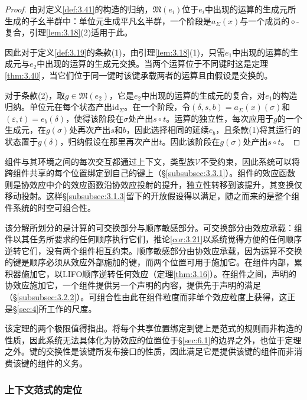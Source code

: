 \begin{proof}
由对定义\ref{def:3.41}的构造的归纳，$\mathfrak{M}(e_i)$位于$e_i$中出现的运算的生成元所生成的子幺半群中：单位元生成平凡幺半群，一个阶段是$a_\Sigma(x)$与一个成员的$\diamond$-复合，引理\ref{lem:3.18}(2)适用于此。

因此对于定义\ref{def:3.19}的条款(1)，由引理\ref{lem:3.18}(1)，只需$e_1$中出现的运算的生成元与$e_2$中出现的运算的生成元交换。当两个运算位于不同键时这是定理\ref{thm:3.40}，当它们位于同一键时该键承载两者的运算且由假设是交换的。

对于条款(2)，取$g \in \mathfrak{M}(e_2)$，它是$e_2$中出现的运算的生成元的复合，对$e_1$的构造归纳。单位元在每个状态产出$\mathrm{id}_\Sigma$。在一个阶段，令$(\delta, s, b) = a_\Sigma(x)(\sigma)$和$(\varepsilon, t) = e_b(\delta)$，使得该阶段在$\sigma$处产出$s \circ t$。运算的独立性，每次应用于$g$的一个生成元，在$g(\sigma)$处再次产出$s$和$b$，因此选择相同的延续$e_b$，且条款(1)将其运行的状态置于$g(\delta)$，归纳假设在那里再次产出$t$。因此该阶段在$g(\sigma)$处产出$s \circ t$。
\end{proof}

组件与其环境之间的每次交互都通过上下文，类型族$\mathcal{V}$不受约束，因此系统可以将跨组件共享的每个位置绑定到自己的键上（\S\ref{subsubsec:3.3.1}）。组件的效应函数则是协效应中介的效应函数沿协效应投射的提升，独立性转移到该提升，其变换仅移动投射。这样\S\ref{subsubsec:3.1.3}留下的开放假设得以满足，随之而来的是整个组件系统的时空可组合性。

该分解所划分的是计算的可交换部分与顺序敏感部分。可交换部分由效应承载：组件以其任务所要求的任何顺序执行它们，推论\ref{cor:3.21}以系统觉得方便的任何顺序逆转它们，没有两个组件相互约束。顺序敏感部分由协效应承载，因为运算不交换的键是顺序必须从效应外部施加的键，而两个位置可用于施加它。在组件内部，累积器施加它，以LIFO顺序逆转任何效应（定理\ref{thm:3.16}）。在组件之间，声明的协效应施加它，一个组件提供另一个声明的内容，提供先于声明的满足（\S\ref{subsubsec:3.2.2}）。可组合性由此在组件粒度而非单个效应粒度上获得，这正是\S\ref{sec:4}所工作的尺度。

该定理的两个极限值得指出。将每个共享位置绑定到键上是范式的规则而非构造的性质，因此系统无法具体化为协效应的位置位于\S\ref{sec:6.1}的边界之外，也位于定理之外。键的交换性是该键所发布接口的性质，因此满足它是提供该键的组件而非消费该键的组件的义务。

\subsubsection{上下文范式的定位}\label{subsubsec:3.3.3}

